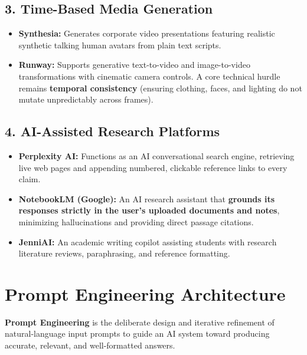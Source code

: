 \subsection{3. Time-Based Media Generation}
\begin{itemize}[leftmargin=1.2em]
    \item \textbf{Synthesia:} Generates corporate video presentations featuring realistic synthetic talking human avatars from plain text scripts.
    \item \textbf{Runway:} Supports generative text-to-video and image-to-video transformations with cinematic camera controls. A core technical hurdle remains \textbf{temporal consistency} (ensuring clothing, faces, and lighting do not mutate unpredictably across frames).
\end{itemize}

\subsection{4. AI-Assisted Research Platforms}
\begin{itemize}[leftmargin=1.2em]
    \item \textbf{Perplexity AI:} Functions as an AI conversational search engine, retrieving live web pages and appending numbered, clickable reference links to every claim.
    \item \textbf{NotebookLM (Google):} An AI research assistant that \textbf{grounds its responses strictly in the user's uploaded documents and notes}, minimizing hallucinations and providing direct passage citations.
    \item \textbf{JenniAI:} An academic writing copilot assisting students with research literature reviews, paraphrasing, and reference formatting.
\end{itemize}

\section{Prompt Engineering Architecture}

\textbf{Prompt Engineering} is the deliberate design and iterative refinement of natural-language input prompts to guide an AI system toward producing accurate, relevant, and well-formatted answers.

